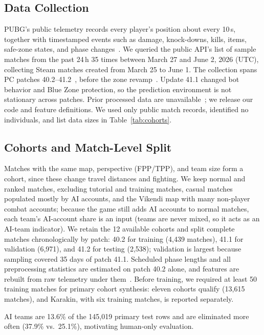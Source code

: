 \documentclass[sigconf,anonymous,nonacm]{acmart}
\begin{document}
\subsection{Data Collection}
\label{sec:method:data}
PUBG's public telemetry records every player's position about every 10\,s, together with timestamped events such as damage, knock-downs, kills, items, safe-zone states, and phase changes~\cite{PUBGAPI}.
We queried the public API's list of sample matches from the past 24\,h 35 times between March 27 and June 2, 2026 (UTC), collecting Steam matches created from March 25 to June 1.
The collection spans PC patches 40.2--41.2~\cite{PUBGPatchNotes2026}, before the zone revamp~\cite{PUBGBlueZone2026}. Update 41.1 changed bot behavior and Blue Zone protection, so the prediction environment is not stationary across patches.
Prior processed data are unavailable~\cite{Sagong25a,KRAFTON}; we release our code and feature definitions.
We used only public match records, identified no individuals, and list data sizes in Table~\ref{tab:cohorts}.

\subsection{Cohorts and Match-Level Split}
\label{sec:method:cohort}
Matches with the same map, perspective (FPP/TPP), and team size form a cohort, since these change travel distances and fighting.
We keep normal and ranked matches, excluding tutorial and training matches, casual matches populated mostly by AI accounts, and the Vikendi map with many non-player combat accounts; because the game still adds AI accounts to normal matches, each team's AI-account share is an input (teams are never mixed, so it acts as an AI-team indicator).
We retain the 12 available cohorts and split complete matches chronologically by patch: 40.2 for training (4,439 matches), 41.1 for validation (6,971), and 41.2 for testing (2,538); validation is largest because sampling covered 35 days of patch 41.1. Scheduled phase lengths and all preprocessing statistics are estimated on patch 40.2 alone, and features are rebuilt from raw telemetry under them~\cite{Kaufman12}. Before training, we required at least 50 training matches for primary cohort synthesis: eleven cohorts qualify (13,615 matches), and Karakin, with six training matches, is reported separately.

AI teams are 13.6\% of the 145,019 primary test rows and are eliminated more often (37.9\% vs.\ 25.1\%), motivating human-only evaluation.
\end{document}
